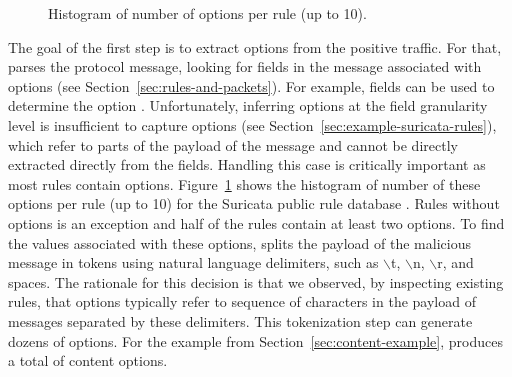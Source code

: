 \documentclass[runningheads]{llncs}
\begin{document}
\begin{figure}
  \centering
  \vspace{-8ex}
  \caption{\label{fig:distribution-contents}Histogram of number of
     options per rule (up to 10).}
\end{figure}
The goal of the first step is to extract options from the positive
traffic. For that, \tname{} parses the protocol message, looking for
fields in the message associated with options (see
Section~\ref{sec:rules-and-packets}). For example, fields
  can be used to determine the option
. Unfortunately, inferring options at the field granularity
level is insufficient to capture  options (see
Section~\ref{sec:example-suricata-rules}), which refer to parts of the
payload of the message and cannot be directly extracted directly from
the fields. Handling this case is critically important as most rules
contain 
options. Figure~\ref{fig:distribution-contents} shows the histogram of
number of these options per rule (up to 10) for the Suricata public
rule database . Rules without  options is an
exception and half of the rules contain at least two 
options.  To find the values associated with these options, \tname{}
splits the payload of the malicious message in tokens using natural
language delimiters, such as $\backslash$t, $\backslash$n,
$\backslash$r, and spaces. The rationale for this decision is that we
observed, by inspecting existing rules, that  options
typically refer to sequence of characters in the payload of messages
separated by these delimiters. This tokenization step can generate
dozens of options. For the example from
Section~\ref{sec:content-example}, \tname{} produces a total of
 content options.
\end{document}
